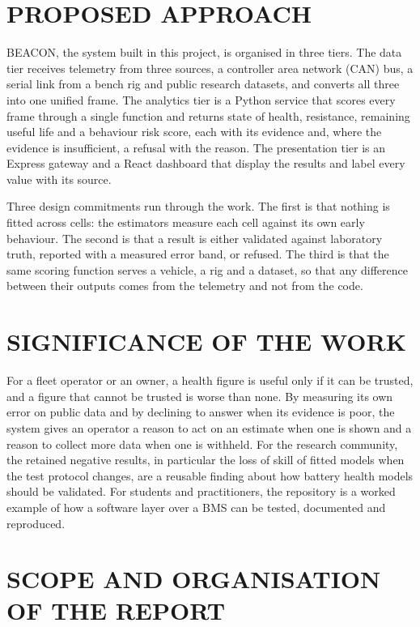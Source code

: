 \section{PROPOSED APPROACH}

BEACON, the system built in this project, is organised in three tiers. The data tier receives telemetry from three sources, a controller area network (CAN) bus, a serial link from a bench rig and public research datasets, and converts all three into one unified frame. The analytics tier is a Python service that scores every frame through a single function and returns state of health, resistance, remaining useful life and a behaviour risk score, each with its evidence and, where the evidence is insufficient, a refusal with the reason. The presentation tier is an Express gateway and a React dashboard that display the results and label every value with its source.

Three design commitments run through the work. The first is that nothing is fitted across cells: the estimators measure each cell against its own early behaviour. The second is that a result is either validated against laboratory truth, reported with a measured error band, or refused. The third is that the same scoring function serves a vehicle, a rig and a dataset, so that any difference between their outputs comes from the telemetry and not from the code.

\section{SIGNIFICANCE OF THE WORK}

For a fleet operator or an owner, a health figure is useful only if it can be trusted, and a figure that cannot be trusted is worse than none. By measuring its own error on public data and by declining to answer when its evidence is poor, the system gives an operator a reason to act on an estimate when one is shown and a reason to collect more data when one is withheld. For the research community, the retained negative results, in particular the loss of skill of fitted models when the test protocol changes, are a reusable finding about how battery health models should be validated. For students and practitioners, the repository is a worked example of how a software layer over a BMS can be tested, documented and reproduced.

\section{SCOPE AND ORGANISATION OF THE REPORT}

